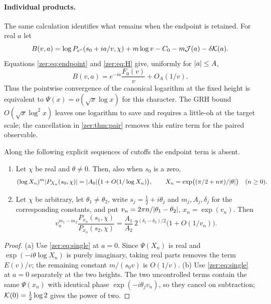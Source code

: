 \paragraph{Individual products.}
The same calculation identifies what remains when the endpoint is retained. For real $a$ let
\[
 B(v,a)=\log P_{e^v}(s_0+ia/v,\chi)+m\log v-C_0-m\mathcal{J}(a)-\delta\mathcal{K}(a).
\]
Equations \eqref{zer:eq:endpoint} and \eqref{zer:eq:H} give, uniformly for $\lvert a\rvert\le A$,
\begin{equation}\label{zer:eq:single}
 B(v,a)=e^{-ia}\frac{F_0(v)}v+O_A(1/v).
\end{equation}
Thus the pointwise convergence of the canonical logarithm at the fixed height is equivalent to
$\Psi(x)=o(\sqrt x\log x)$ for this character. The GRH bound $O(\sqrt x\log^2x)$ leaves one
logarithm to save and requires a little-oh at the target scale; the cancellation in
\cref{zer:thm:pair} removes this entire term for the paired observable.

\begin{proposition}\label{zer:prop:subseq}
Along the following explicit sequences of cutoffs the endpoint term is absent.
\begin{enumerate}[label=\textup{(\alph*)}]
\item Let $\chi$ be real and $\theta\ne0$. Then, also when $s_0$ is a zero,
\[
 (\log X_n)^m\lvert P_{X_n}(s_0,\chi)\rvert=\lvert A_0\rvert\bigl(1+O(1/\log X_n)\bigr),\qquad
 X_n=\exp\bigl((\pi/2+n\pi)/\lvert\theta\rvert\bigr)\quad(n\ge0).
\]
\item Let $\chi$ be arbitrary, let $\theta_1\ne\theta_2$, write $s_j=\tfrac12+i\theta_j$ and
$m_j,A_j,\delta_j$ for the corresponding constants, and put
$v_n=2\pi n/\lvert\theta_1-\theta_2\rvert$, $x_n=\exp(v_n)$. Then
\[
 v_n^{m_1-m_2}\frac{P_{x_n}(s_1,\chi)}{P_{x_n}(s_2,\chi)}
 =\frac{A_1}{A_2}\,2^{(\delta_1-\delta_2)/2}\bigl(1+O(1/v_n)\bigr).
\]
\end{enumerate}
\end{proposition}
\begin{proof}
(a) Use \eqref{zer:eq:single} at $a=0$. Since $\Psi(X_n)$ is real and
$\exp(-i\theta\log X_n)$ is purely imaginary, taking real parts removes the term
$E(v)/v$; the remaining constant $m/(s_0v)$ is $O(1/v)$.
(b) Use \eqref{zer:eq:single} at $a=0$ separately at the two heights. The two uncontrolled
terms contain the same $\Psi(x_n)$ with identical phase $\exp(-i\theta_jv_n)$, so they cancel
on subtraction; $\mathcal{K}(0)=\tfrac12\log2$ gives the power of two.
\end{proof}

